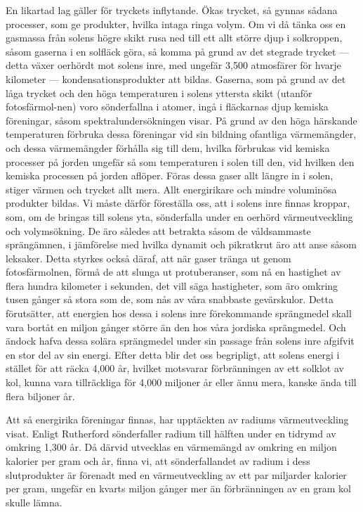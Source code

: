 \documentclass[a4paper, 12pt, oneside, swedish]{article}
\begin{document}
En likartad lag gäller för tryckets inflytande. Ökas trycket, så gynnas sådana processer, som ge produkter, hvilka intaga ringa volym. Om vi då tänka oss en gasmassa från solens högre skikt rusa ned till ett allt större djup i solkroppen, såsom gaserna i en solfläck göra, så komma på grund av det stegrade trycket --- detta växer oerhördt mot solens inre, med ungefär 3,500 atmosfärer för hvarje kilometer --- kondensationsprodukter att bildas. Gaserna, som på grund av det låga trycket och den höga temperaturen i solens yttersta skikt (utanför fotosfärmol-nen) voro sönderfallna i atomer, ingå i fläckarnas djup kemiska föreningar, såsom spektralundersökningen visar. På grund av den höga härskande temperaturen förbruka dessa föreningar vid sin bildning ofantliga värmemängder, och dessa värmemängder förhålla sig till dem, hvilka förbrukas vid kemiska processer på jorden ungefär så som temperaturen i solen till den, vid hvilken den kemiska processen på jorden aflöper. Föras dessa gaser allt längre in i solen, stiger värmen och trycket allt mera. Allt energirikare och mindre voluminösa produkter bildas. Vi måste därför föreställa oss, att i solens inre finnas kroppar, som, om de bringas till solens yta, sönderfalla under en oerhörd värmeutveckling och volymsökning. De äro således att betrakta såsom de våldsammaste sprängämnen, i jämförelse med hvilka dynamit och pikratkrut äro att anse såsom leksaker. Detta styrkes också däraf, att när gaser tränga ut genom fotosfärmolnen, förmå de att slunga ut protuberanser, som nå en hastighet av flera hundra kilometer i sekunden, det vill säga hastigheter, som äro omkring tusen gånger så stora som de, som nås av våra snabbaste gevärskulor. Detta förutsätter, att energien hos dessa i solens inre förekommande sprängmedel skall vara bortåt en miljon gånger större än den hos våra jordiska sprängmedel. Och ändock hafva dessa solära sprängmedel under sin passage från solens inre afgifvit en stor del av sin energi. Efter detta blir det oss begripligt, att solens energi i stället för att räcka 4,000 år, hvilket motsvarar förbränningen av ett solklot av kol, kunna vara tillräckliga för 4,000 miljoner år eller ännu mera, kanske ända till flera biljoner år.

Att så energirika föreningar finnas, har upptäckten av radiums värmeutveckling visat. Enligt Rutherford sönderfaller radium till hälften under en tidrymd av omkring 1,300 år. Då därvid utvecklas en värmemängd av omkring en miljon kalorier per gram och år, finna vi, att sönderfallandet av radium i dess slutprodukter är förenadt med en värmeutveckling av ett par miljarder kalorier per gram, ungefär en kvarts miljon gånger mer än förbränningen av en gram kol skulle lämna.
\end{document}
